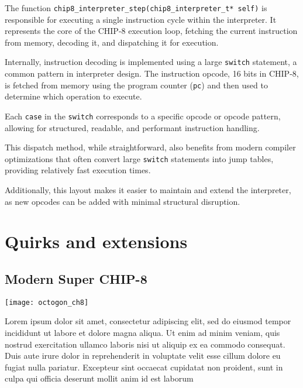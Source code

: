 \par The function \texttt{chip8\_interpreter\_step(chip8\_interpreter\_t* self)} is responsible for executing a single instruction cycle within the interpreter. It represents the core of the CHIP-8 execution loop, fetching the current instruction from memory, decoding it, and dispatching it for execution.

\par Internally, instruction decoding is implemented using a large \texttt{switch} statement, a common pattern in interpreter design. The instruction opcode, 16 bits in CHIP-8, is fetched from memory using the program counter (\texttt{pc}) and then used to determine which operation to execute.

\par Each \texttt{case} in the \texttt{switch} corresponds to a specific opcode or opcode pattern, allowing for structured, readable, and performant instruction handling.

\par This dispatch method, while straightforward, also benefits from modern compiler optimizations that often convert large \texttt{switch} statements into jump tables, providing relatively fast execution times.

\par Additionally, this layout makes it easier to maintain and extend the interpreter, as new opcodes can be added with minimal structural disruption.

\section{Quirks and extensions}
\label{sec:ch3sec4}

\subsection{Modern Super CHIP-8}
\label{subsec:ch3sec4sub1}

\begin{minipage}{\linewidth}
\texttt{[image: octogon\_ch8]}
\end{minipage}

\par Lorem ipsum dolor sit amet, consectetur adipiscing elit, sed do eiusmod tempor incididunt ut labore et dolore magna aliqua. Ut enim ad minim veniam, quis nostrud exercitation ullamco laboris nisi ut aliquip ex ea commodo consequat. Duis aute irure dolor in reprehenderit in voluptate velit esse cillum dolore eu fugiat nulla pariatur. Excepteur sint occaecat cupidatat non proident, sunt in culpa qui officia deserunt mollit anim id est laborum

